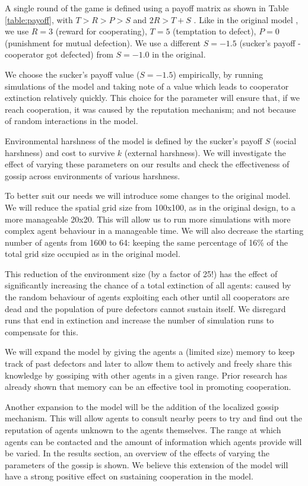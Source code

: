 \documentclass[english]{article}
\begin{document}
A single round of the game is defined using a payoff matrix as shown in Table \ref{table:payoff}, with $T > R > P > S$ and $2R > T + S$ \citep{chammah1965}.
Like in the original model \citep{smaldino},
we use $R = 3$ (reward for cooperating),
$T = 5$ (temptation to defect),
$P = 0$ (punishment for mutual defection).
We use a different $S = -1.5$ (sucker's payoff - cooperator got defected) from $S = -1.0$ in the original.

We choose the sucker's payoff value ($S = -1.5$) empirically,
by running simulations of the model and taking note of a value which leads to cooperator extinction relatively quickly.
This choice for the parameter will ensure that, if we reach cooperation, it was caused by the reputation mechanism;
and not because of random interactions in the model.

Environmental harshness of the model is defined by
the sucker's payoff $S$ (social harshness)
and cost to survive $k$ (external harshness).
We will investigate the effect of varying these parameters on our results
and check the effectiveness of gossip across environments of various harshness.

To better suit our needs we will introduce some changes to the original model.
We will reduce the spatial grid size from 100x100, as in the original design, to a more manageable 20x20.
This will allow us to run more simulations with more complex agent behaviour in a manageable time.
We will also decrease the starting number of agents from 1600 to 64: keeping the same percentage of 16\% of the total grid size occupied as in the original model.

This reduction of the environment size (by a factor of 25!) has the effect of significantly increasing the chance of a total extinction of all agents:
caused by the random behaviour of agents exploiting each other until all cooperators are dead and the population of pure defectors cannot sustain itself.
We disregard runs that end in extinction and increase the number of simulation runs to compensate for this.

We will expand the model by giving the agents a (limited size) memory to keep track of past defectors and later to allow them to actively and freely share this knowledge by gossiping with other agents in a given range.
Prior research \citep{memory, reciprocity, adaptive-interaction} has already shown that memory can be an effective tool in promoting cooperation.

Another expansion to the model will be the addition of the localized gossip mechanism.
This will allow agents to consult nearby peers to try and find out the reputation of agents unknown to the agents themselves.
The range at which agents can be contacted and the amount of information which agents provide will be varied.
In the results section, an overview of the effects of varying the parameters of the gossip is shown.
We believe this extension of the model will have a strong positive effect on sustaining cooperation in the model.
\end{document}
